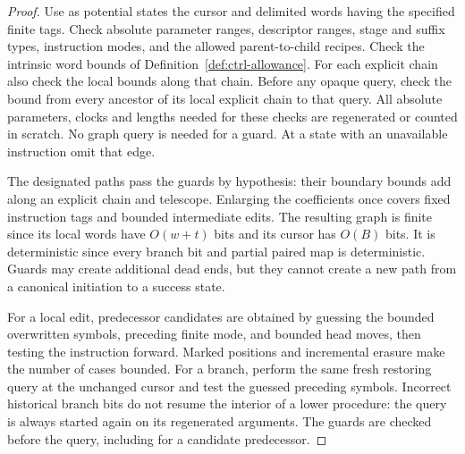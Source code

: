 \begin{proof}
Use as potential states the cursor and delimited words having the
specified finite tags.  Check absolute parameter ranges, descriptor
ranges, stage and suffix types, instruction modes, and the allowed
parent-to-child recipes.  Check the intrinsic word bounds of
Definition~\ref{def:ctrl-allowance}.  For each explicit chain also check
the local bounds along that chain.  Before any opaque query, check the
bound from every ancestor of its local explicit chain to that query.
All absolute parameters, clocks and lengths needed for these checks are
regenerated or counted in scratch.  No graph query is needed for a
guard.  At a state with an unavailable instruction omit that edge.

The designated paths pass the guards by hypothesis: their boundary
bounds add along an explicit chain and telescope.  Enlarging the
coefficients once covers fixed instruction tags and bounded intermediate
edits.  The resulting graph is finite since its local words have
$O(w+t)$ bits and its cursor has $O(B)$ bits.  It is deterministic since
every branch bit and partial paired map is deterministic.  Guards may
create additional dead ends, but they cannot create a new path from a
canonical initiation to a success state.

For a local edit, predecessor candidates are obtained by guessing the
bounded overwritten symbols, preceding finite mode, and bounded head
moves, then testing the instruction forward.  Marked positions and
incremental erasure make the number of cases bounded.  For a branch,
perform the same fresh restoring query at the unchanged cursor and test
the guessed preceding symbols.  Incorrect historical branch bits do not
resume the interior of a lower procedure: the query is always started
again on its regenerated arguments.  The guards are checked before the
query, including for a candidate predecessor.


\end{proof}
